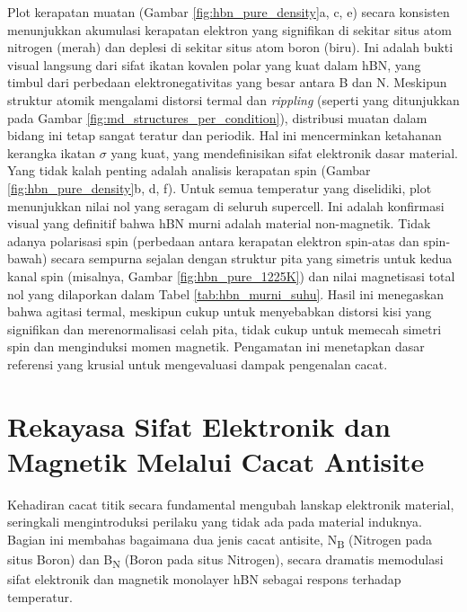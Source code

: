 Plot kerapatan muatan (Gambar \ref{fig:hbn_pure_density}a, c, e) secara konsisten menunjukkan akumulasi kerapatan elektron yang signifikan di sekitar situs atom nitrogen (merah) dan deplesi di sekitar situs atom boron (biru).
Ini adalah bukti visual langsung dari sifat ikatan kovalen polar yang kuat dalam hBN, yang timbul dari perbedaan elektronegativitas yang besar antara B dan N. Meskipun struktur atomik mengalami distorsi termal dan \emph{rippling} (seperti yang ditunjukkan pada Gambar \ref{fig:md_structures_per_condition}), distribusi muatan dalam bidang ini tetap sangat teratur dan periodik.
Hal ini mencerminkan ketahanan kerangka ikatan $\sigma$ yang kuat, yang mendefinisikan sifat elektronik dasar material.
Yang tidak kalah penting adalah analisis kerapatan spin (Gambar \ref{fig:hbn_pure_density}b, d, f).
Untuk semua temperatur yang diselidiki, plot menunjukkan nilai nol yang seragam di seluruh supercell.
Ini adalah konfirmasi visual yang definitif bahwa hBN murni adalah material non-magnetik.
Tidak adanya polarisasi spin (perbedaan antara kerapatan elektron spin-atas dan spin-bawah) secara sempurna sejalan dengan struktur pita yang simetris untuk kedua kanal spin (misalnya, Gambar \ref{fig:hbn_pure_1225K}) dan nilai magnetisasi total nol yang dilaporkan dalam Tabel \ref{tab:hbn_murni_suhu}.
Hasil ini menegaskan bahwa agitasi termal, meskipun cukup untuk menyebabkan distorsi kisi yang signifikan dan merenormalisasi celah pita, tidak cukup untuk memecah simetri spin dan menginduksi momen magnetik.
Pengamatan ini menetapkan dasar referensi yang krusial untuk mengevaluasi dampak pengenalan cacat.

\section{Rekayasa Sifat Elektronik dan Magnetik Melalui Cacat Antisite}
\label{sec:hbn_defek}
Kehadiran cacat titik secara fundamental mengubah lanskap elektronik material, seringkali mengintroduksi perilaku yang tidak ada pada material induknya.
Bagian ini membahas bagaimana dua jenis cacat antisite, N\textsubscript{B} (Nitrogen pada situs Boron) dan B\textsubscript{N} (Boron pada situs Nitrogen), secara dramatis memodulasi sifat elektronik dan magnetik monolayer hBN sebagai respons terhadap temperatur.
